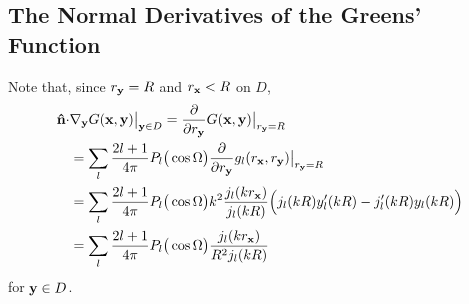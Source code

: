 \subsection{The Normal Derivatives of the Greens' Function}

Note that, since $r_{\bf y}=R$ and $r_{\bf x}<R$ on $D$, 
\begin{align*}
{\bf \hat n}\cdot&\nabla_{\bf y} G({\bf x},{\bf y})\big|_{{\bf y}\in D}=\frac{\partial}{\partial r_{\bf y}} G({\bf x},{\bf y})\big|_{r_{\bf y}=R}
\\
&=\sum_l\frac{2l+1}{4\pi}P_l\big(\cos\Omega\big)\frac{\partial}{\partial r_{\bf y}} g_l(r_{\bf x},r_{\bf y})\big|_{r_{\bf y}=R}
\\
&=
\sum_l\frac{2l+1}{4\pi}P_l\big(\cos\Omega\big)
k^2\frac{j_l(kr_{\bf x})}{j_l(kR)}\Big(j_l(kR)y_l^\prime(kR)-j_l^\prime(kR)y_l(kR)\Big)
\\
&=
\sum_l\frac{2l+1}{4\pi}P_l\big(\cos\Omega\big)\frac{j_l(kr_{\bf x})}{R^2j_l(kR)}
\end{align*}
for ${\bf y}\in D$.

